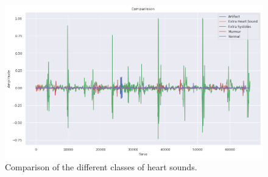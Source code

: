 \begin{figure}[h]
    \centering
    \includegraphics[width=\columnwidth]{../images/comparison_heart_beat_audio.png}
    \caption{Comparison of the different classes of heart sounds.}
    \label{fig:comparison_heart_beat_audio}
\end{figure}

